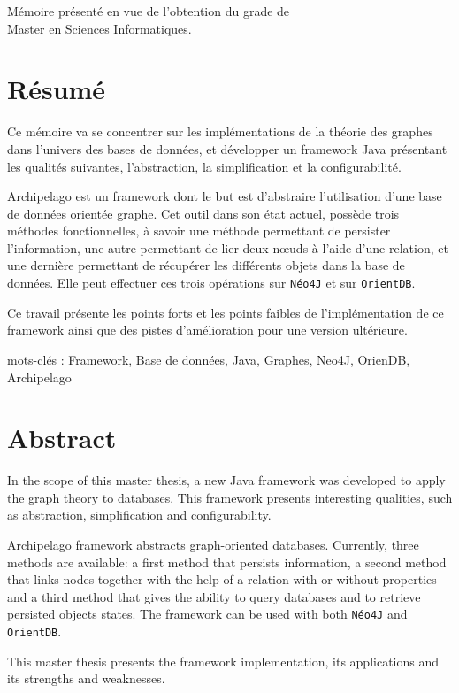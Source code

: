 \documentclass[a4paper,fleqn,12pt,oneside]{report}
\begin{document}
\vspace{0.5cm}
\begin{center}
M\'emoire pr\'esent\'e en vue de l'obtention du grade de\\
Master en Sciences Informatiques.
\end{center}

\section*{Résumé}

Ce mémoire va se concentrer sur les implémentations de la théorie des graphes dans l'univers des bases de données, et développer un framework Java présentant les qualités suivantes, l'abstraction, la simplification et la configurabilité. 

Archipelago est un framework dont le but est d'abstraire l'utilisation d'une base de données orientée graphe. Cet outil dans son  état actuel, possède trois méthodes fonctionnelles, à savoir une méthode permettant de persister l'information, une autre permettant de lier deux nœuds à l'aide d'une relation, et une dernière permettant de récupérer les différents objets dans la base de données. Elle peut effectuer ces trois opérations sur \texttt{Néo4J} et sur \texttt{OrientDB}.

Ce travail présente les points forts et les points faibles de l'implémentation de ce framework ainsi que des pistes d'amélioration pour une version ultérieure.

\quad \quad \underline{mots-clés :} Framework, Base de données, Java, Graphes, Neo4J, OrienDB, Archipelago
\section*{Abstract}

In the scope of this master thesis, a new Java framework was developed to apply the graph theory to databases. This framework presents interesting qualities, such as abstraction, simplification and configurability. 

Archipelago framework abstracts graph-oriented databases. Currently, three methods are available: a first method that persists information, a second method that links nodes together with the help of a relation with or without properties and a third method that gives the ability to query databases and to retrieve persisted objects states. The framework can be used with both \texttt{Néo4J} and \texttt{OrientDB}.

This master thesis presents the framework implementation, its applications and its strengths and weaknesses.
\end{document}
